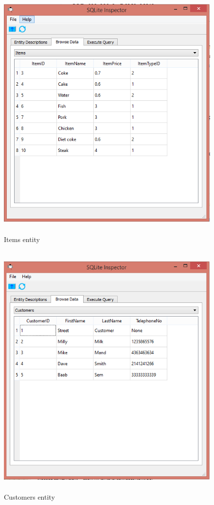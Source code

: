 \begin{figure}[H]
    \includegraphics[height = 13cm]{./Maintenance/images/items}
    \caption{Items entity} \label{fig:items}
\end{figure}

\begin{figure}[H]
    \includegraphics[height = 13cm]{./Maintenance/images/customers}
    \caption{Customers entity} \label{fig:customers}
\end{figure}

